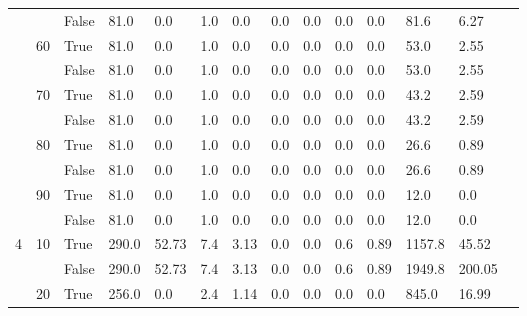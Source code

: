 \documentclass{article}
\begin{document}
\begin{landscape}
\begin{small}
\begin{longtable}[c]{@{}lll|ll|ll|ll|ll|lll@{}}
   &    & False & 81.0            & 0.0            & 1.0           & 0.0           & 0.0           & 0.0           & 0.0           & 0.0           & 81.6          & 6.27        &  \\
   & 60 & True  & 81.0            & 0.0            & 1.0           & 0.0           & 0.0           & 0.0           & 0.0           & 0.0           & 53.0          & 2.55        &  \\
   &    & False & 81.0            & 0.0            & 1.0           & 0.0           & 0.0           & 0.0           & 0.0           & 0.0           & 53.0          & 2.55        &  \\
   & 70 & True  & 81.0            & 0.0            & 1.0           & 0.0           & 0.0           & 0.0           & 0.0           & 0.0           & 43.2          & 2.59        &  \\
   &    & False & 81.0            & 0.0            & 1.0           & 0.0           & 0.0           & 0.0           & 0.0           & 0.0           & 43.2          & 2.59        &  \\
   & 80 & True  & 81.0            & 0.0            & 1.0           & 0.0           & 0.0           & 0.0           & 0.0           & 0.0           & 26.6          & 0.89        &  \\
   &    & False & 81.0            & 0.0            & 1.0           & 0.0           & 0.0           & 0.0           & 0.0           & 0.0           & 26.6          & 0.89        &  \\
   & 90 & True  & 81.0            & 0.0            & 1.0           & 0.0           & 0.0           & 0.0           & 0.0           & 0.0           & 12.0          & 0.0         &  \\
   &    & False & 81.0            & 0.0            & 1.0           & 0.0           & 0.0           & 0.0           & 0.0           & 0.0           & 12.0          & 0.0         &  \\
  \midrule
4  & 10 & True  & 290.0           & 52.73          & 7.4           & 3.13          & 0.0           & 0.0           & 0.6           & 0.89          & 1157.8        & 45.52       &  \\
   &    & False & 290.0           & 52.73          & 7.4           & 3.13          & 0.0           & 0.0           & 0.6           & 0.89          & 1949.8        & 200.05      &  \\
   & 20 & True  & 256.0           & 0.0            & 2.4           & 1.14          & 0.0           & 0.0           & 0.0           & 0.0           & 845.0         & 16.99       &  \\

\end{longtable}
\end{small}
\end{landscape}
\end{document}
